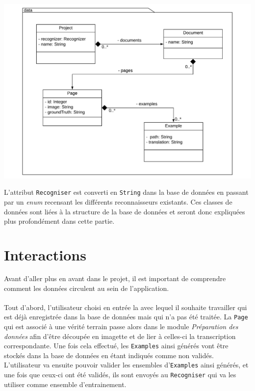 \begin{mdframed}[frametitle={Figure 9 : Structure du package de données}, innerbottommargin=10]
\begin{center}
\includegraphics[scale=0.4]{assets/UML_data.pdf}
\end{center}
\end{mdframed}

L'attribut \texttt{Recogniser} est converti en \texttt{String} dans la base de données en passant par un \textit{enum} recensant les différents reconnaisseurs existants. Ces classes de données sont liées à la structure de la base de données et seront donc expliquées plus profondément dans cette partie.

\section{Interactions}

Avant d'aller plus en avant dans le projet, il est important de comprendre comment les données circulent au sein de l'application. 

\paragraph{}
Tout d'abord, l'utilisateur choisi en entrée la  avec lequel il souhaite travailler qui est déjà enregistrée dans la base de données mais qui n'a pas été traitée. La \texttt{Page} qui est associé à une vérité terrain passe alors dans le module \textit{Préparation des données} afin d'être découpée en imagette et de lier à celles-ci la transcription correspondante. Une fois cela effectué, les \texttt{Examples} ainsi générés vont être stockés dans la base de données en étant indiqués comme non validés. L'utilisateur va ensuite pouvoir valider les ensembles d'\texttt{Examples} ainsi générés, et une fois que ceux-ci ont été validés, ils sont envoyés au \texttt{Recogniser} qui va les utiliser comme ensemble d'entrainement.

